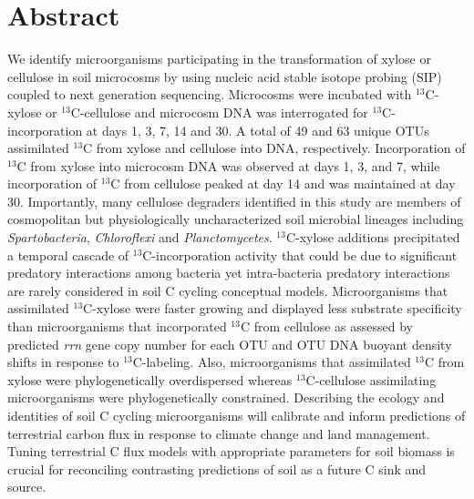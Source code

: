 \section{Abstract} We identify microorganisms participating in the
transformation of xylose or cellulose in soil microcosms by using nucleic acid
stable isotope probing (SIP) coupled to next generation sequencing. Microcosms
were incubated with $^{13}$C-xylose or $^{13}$C-cellulose and microcosm DNA was
interrogated for $^{13}$C-incorporation at days 1, 3, 7,
14 and 30. A total of 49 and 63 unique OTUs assimilated $^{13}$C from xylose
and cellulose into DNA, respectively. Incorporation of $^{13}$C from xylose
into microcosm DNA was observed at days 1, 3, and 7, while incorporation of
$^{13}$C from cellulose peaked at day 14 and was maintained at day 30.
Importantly, many cellulose degraders identified in this study are members of
cosmopolitan but physiologically uncharacterized soil microbial lineages
including \textit{Spartobacteria}, \textit{Chloroflexi} and
\textit{Planctomycetes}. $^{13}$C-xylose additions precipitated a temporal
cascade of $^{13}$C-incorporation activity that could be due to significant
predatory interactions among bacteria yet intra-bacteria predatory interactions
are rarely considered in soil C cycling conceptual models. Microorganisms that
assimilated $^{13}$C-xylose were faster growing and displayed less substrate
specificity than microorganisms that incorporated $^{13}$C from cellulose as
assessed by predicted \textit{rrn} gene copy number for each OTU and OTU DNA
buoyant density shifts in response to $^{13}$C-labeling. Also, microorganisms
that assimilated $^{13}$C from xylose were phylogenetically overdispersed
whereas $^{13}$C-cellulose assimilating microorganisms were phylogenetically
constrained. Describing the ecology and identities of soil C cycling
microorganisms will calibrate and inform predictions of terrestrial carbon flux
in response to climate change and land management. Tuning terrestrial C flux
models with appropriate parameters for soil biomass is crucial for reconciling
contrasting predictions of soil as a future C sink and source.
